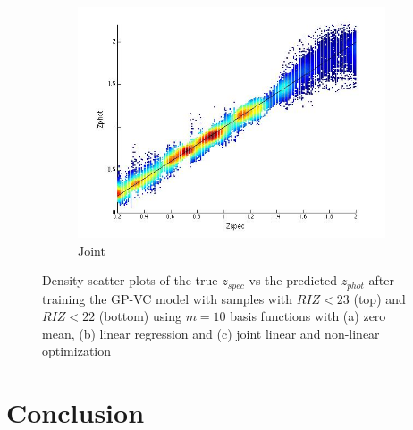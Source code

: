 \documentclass[useAMS,usenatbib,fleqn]{mn2e}
\begin{document}
\begin{figure}
\begin{subfigure}[b]{73px}
                \includegraphics[trim = 35px 15px 50px 25px, clip=true,width=\textwidth]{22_J.jpg}
                \caption{Joint}
        \end{subfigure}
        
        \caption{Density scatter plots of the true $z_{spec}$ vs the predicted $z_{phot}$ after training the GP-VC model with samples with $RIZ<23$ (top) and $RIZ<22$ (bottom) using $m=10$ basis functions with (a) zero mean, (b) linear regression and (c) joint linear and non-linear optimization}
        \label{fig-RIZ-splits}
\end{figure}


\section{Conclusion}
\label{sec-conclusion}

\footnotesize{

	
}
\end{document}
